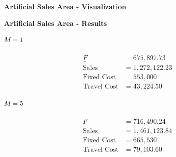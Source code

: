 \begin{frame}{\textbf{Artificial Sales Area - Visualization}}
\begin{center}
    
\end{center}
\end{frame}

\begin{frame}{\textbf{Artificial Sales Area - Results}}
\begin{minipage}{0.48\linewidth}
\begin{center}
    $M = 1$\\[0.5em]
     \\[-0.5cm]
    \begin{align*}
    \underline{F}&=675,897.73 \\
    \text{Sales} &= 1,272,122.23 \\
    \text{Fixed Cost} &= 553,000 \\
    \text{Travel Cost} &= 43,224.50
    \end{align*}
    
\end{center}
\end{minipage}
\begin{minipage}{0.48\linewidth}
\begin{center}
    $M=5$ \\[0.5em]
     \\[-0.5cm]
    \begin{align*}
    \underline{F}&=716,490.24 \\
    \text{Sales} &= 1,461,123.84 \\
    \text{Fixed Cost} &= 665,530 \\
    \text{Travel Cost} &= 79,103.60
    \end{align*}
\end{center}
\end{minipage}
\end{frame}


